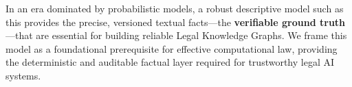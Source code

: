 \documentclass[11pt]{article}
\begin{document}
In an era dominated by probabilistic models, a robust descriptive model such as this provides the precise, versioned textual facts—the \textbf{verifiable ground truth}—that are essential for building reliable Legal Knowledge Graphs. We frame this model as a foundational prerequisite for effective computational law, providing the deterministic and auditable factual layer required for trustworthy legal AI systems.

 

\end{document}
